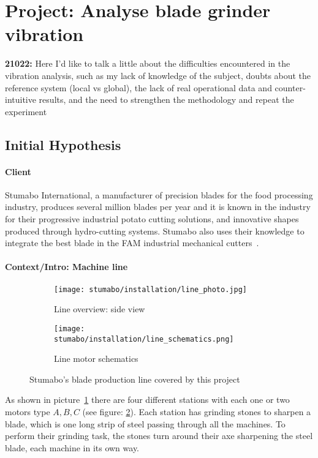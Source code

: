 \section{Project: Analyse blade grinder vibration}

\textbf{21022:} Here I'd like to talk a little about the difficulties encountered in the vibration analysis, such as my lack of knowledge of the subject, doubts about the reference system (local vs global),
the lack of real operational data and counter-intuitive results, and the need to strengthen the methodology and repeat the experiment


\subsection{Initial Hypothesis}
\paragraph{Client} Stumabo International, a manufacturer of precision blades for the food processing industry, produces several million blades per year and it is known in the industry for their progressive industrial potato cutting solutions,
and innovative shapes produced through hydro-cutting systems.
Stumabo also uses their knowledge to integrate the best blade in the FAM industrial mechanical cutters~\cite{Misc:stumabo_en_website}.

\paragraph{Context/Intro: Machine line}
\begin{figure}[ht]
    \begin{subfigure}{\textwidth}
        \texttt{[image: stumabo/installation/line\_photo.jpg]}
        \caption{Line overview: side view}
        \label{fig:line_overview}
    \end{subfigure}
    \begin{subfigure}{\textwidth}
        \texttt{[image: stumabo/installation/line\_schematics.png]}
        \caption{Line motor schematics}
        \label{fig:line_schematics}
    \end{subfigure}
    \caption{Stumabo's blade production line covered by this project}
    \label{fig:stumabo_prod_line}
\end{figure}

As shown in picture~\ref{fig:line_overview} there are four different stations with each one or two motors type ${A,B,C}$ (see figure: \ref{fig:line_schematics}).
Each station has grinding stones to sharpen a blade, which is one long strip of steel passing through all the machines.
To perform their grinding task, the stones turn around their axe sharpening the steel blade, each machine in its own way.

